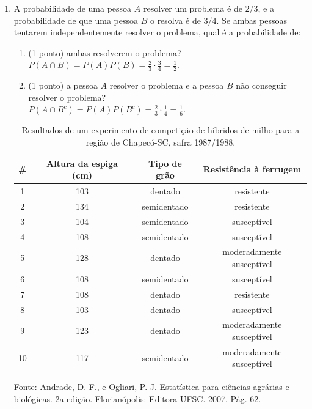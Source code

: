 \documentclass{article}
\begin{document}
\begin{enumerate}


\item A probabilidade de uma pessoa $A$ resolver um problema é de $2/3$, e a probabilidade de que uma pessoa $B$ o resolva é de $3/4$. Se ambas pessoas tentarem independentemente resolver o problema, qual é a probabilidade de:
\begin{enumerate}
	\item (1 ponto) ambas resolverem o problema?\\
	{\color{blue}
		$P(A \cap B) = P(A)P(B) = \frac{2}{3} \cdot \frac{3}{4} = \frac{1}{2}$.
	}
	
	\item (1 ponto) a pessoa $A$ resolver o problema e a pessoa $B$ não conseguir resolver o problema?\\
	{\color{blue}
		$P(A \cap B^c) = P(A) P(B^c) = \frac{2}{3} \cdot \frac{1}{4} = \frac{1}{6}$.
	}

\end{enumerate}


	\begin{table}[thp]
	\caption{Resultados de um experimento de competição de híbridos de milho para a região de Chapecó-SC, safra 1987/1988.}
	\label{t:milho}
	\centering
	\begin{tabular}{cccc}
		\hline
		\# & Altura da espiga (cm) & Tipo de grão & Resistência à ferrugem \\
		\hline
		1 & 103 & dentado & resistente \\
		2 & 134 & semidentado & resistente \\
		3 & 104 & semidentado & susceptível \\
		4 & 108 & semidentado & susceptível \\
		5 & 128 & dentado & moderadamente susceptível \\
		6 & 108 & semidentado & susceptível \\
		7 & 108 & dentado & resistente \\
		8 & 103 & dentado & susceptível \\
		9 & 123 & dentado & moderadamente susceptível \\
		10 & 117 & semidentado & moderadamente susceptível \\
		\hline
	\end{tabular}
\end{table}	
\vspace{-1em}
{\footnotesize Fonte: Andrade, D. F., e Ogliari, P. J. Estatística para ciências agrárias e biológicas. 2a edição. Florianópolis: Editora UFSC. 2007. Pág. 62.}\\


\end{enumerate}
\end{document}
